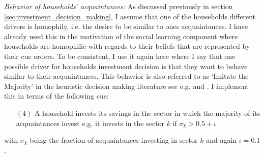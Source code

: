 \textit{Behavior of households' acquaintances:}
As discussed previously in section \ref{sec:investment_decision_making}, I assume that one of the households different drivers is homophily, i.e. the desire to be similar to ones acquaintances. I have already used this in the motivation of the social learning component where households are homophilic with regards to their beliefs that are represented by their cue orders. To be consistent, I use it again here where I say that one possible driver for households investment decision is that they want to behave similar to their acquaintances. This behavior is also referred to as `Imitate the Majority' in the heuristic decision making literature see e.g. \cite{Gigerenzer2009} \cite{garcia2009does} and \cite{gigerenzer2011heuristic}. 
I implement this in terms of the following cue:
\begin{itemize}
  \item [$(4)$] A household invests its savings in the sector in which the majority of its acquaintances invest e.g. it invests in the sector $k$ if $\sigma_k > 0.5 + \iota$
\end{itemize}
with $\sigma_k$ being the fraction of acquaintances investing in sector $k$ and again $\iota=0.1$.

